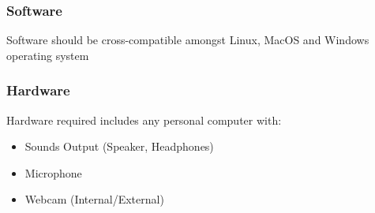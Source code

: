 \documentclass{article}
\begin{document}
\subsubsection{Software}
Software should be cross-compatible amongst Linux, MacOS and Windows operating system
\subsubsection{Hardware}
Hardware required includes any personal computer with:
\begin{itemize}
    \item Sounds Output (Speaker, Headphones)
    \item Microphone
    \item Webcam (Internal/External)
\end{itemize}
\end{document}
